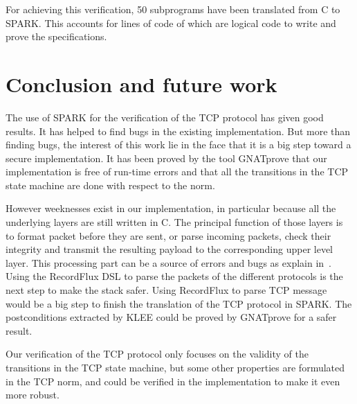 \documentclass[conference]{IEEEtran}
\begin{document}
For achieving this verification, 50 subprograms have been translated from C to
SPARK. This accounts for  lines of code of which  are logical
code to write and prove the specifications.

\section{Conclusion and future work}

The use of SPARK for the verification of the TCP protocol has given good
results. It has helped to find bugs in the existing implementation. But more
than finding bugs, the interest of this work lie in the face that it is a big
step toward a secure implementation. It has been proved by the tool GNATprove
that our implementation is free of run-time errors and that all the transitions
in the TCP state machine are done with respect to the norm.

However weeknesses exist in our implementation, in particular because all the
underlying layers are still written in C. The principal function of those layers
is to format packet before they are sent, or parse incoming packets, check their
integrity and transmit the resulting payload to the corresponding upper level
layer. This processing part can be a source of errors and bugs as explain
in~\cite{Reiher2019RecordFluxFM}.
Using the RecordFlux DSL to parse the packets of the different protocols is the
next step to make the stack safer. Using RecordFlux to parse TCP message
would be a big step to finish the translation of the TCP protocol in SPARK.
The postconditions extracted by KLEE could be proved by GNATprove for a
safer result.

Our verification of the TCP protocol only focuses on the validity of the
transitions in the TCP state machine, but some other properties are formulated
in the TCP norm, and could be verified in the implementation to make it even
more robust.



\end{document}
